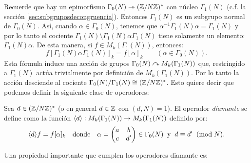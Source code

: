 Recuerde que hay un epimorfismo $\Gamma_0(N)\twoheadrightarrow(\mathbb{Z}/N\mathbb{Z})^*$ con n\'ucleo $\Gamma_1(N)$
(c.f. la secci\'on \ref{sec:subgruposdecongruencia}). Entonces $\Gamma_1(N)$ es un subgrupo normal
de $\Gamma_0(N)$. As\'i, cuando $\alpha\in\Gamma_0(N)$, tenemos que
$\alpha^{-1}\Gamma_1(N)\alpha=\Gamma_1(N)$ y por lo tanto el cociente
$\Gamma_1(N)\setminus\Gamma_1(N)\alpha\Gamma_1(N)$ tiene solamente un elemento: $\Gamma_1(N)\alpha$.
De esta manera, si $f\in M_k(\Gamma_1(N))$, entonces:
\[
  f[\Gamma_1(N)\alpha\Gamma_1(N)]_k=f[\alpha]_k\qquad(\alpha\in\Gamma_0(N)).
\]
Esta f\'ormula induce una acci\'on de grupos $\Gamma_0(N)\curvearrowright M_k(\Gamma_1(N))$ que, restringido
a $\Gamma_1(N)$ act\'ua trivialmente por definici\'on de $M_k(\Gamma_1(N))$. Por lo tanto la
acci\'on desciende al cociente $\Gamma_0(N)/\Gamma_1(N)\cong(\mathbb{Z}/N\mathbb{Z})^*$. Esto quiere decir que
podemos definir la siguiente clase de operadores:

\begin{defin}
  Sea $d\in(\mathbb{Z}/N\mathbb{Z})^*$ (o en general $d\in\mathbb{Z}$ con $(d,N)=1$). El operador \emph{diamante} se
  define como la funci\'on $\langle d \rangle:M_k(\Gamma_1(N))\rightarrow M_k(\Gamma_1(N))$ definido por:
  \[
    \langle d \rangle f=f[\alpha]_k\quad\text{donde}\quad
    \alpha=\begin{pmatrix}a & b\\ c & d'\end{pmatrix}\in\Gamma_0(N)\;\;\text{y}\;\; d\equiv d'\;\;(\mathrm{mod}\; N).
  \]
\end{defin}

Una propiedad importante que cumplen los operadores diamante es:

